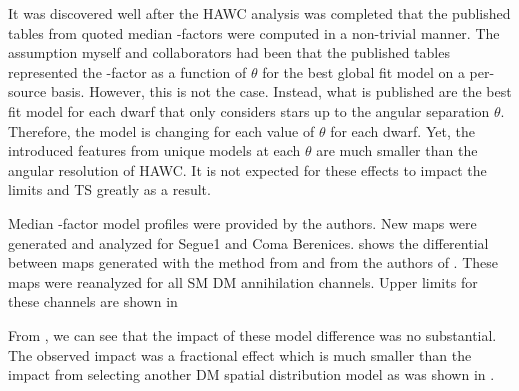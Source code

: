 It was discovered well after the HAWC analysis was completed that the published tables from \GS \cite{Geringer_Sameth_2015} quoted median \J-factors were computed in a non-trivial manner.
The assumption myself and collaborators had been that the published tables represented the \J-factor as a function of $\theta$ for the best global fit model on a per-source basis.
However, this is not the case.
Instead, what is published are the best fit model for each dwarf that only considers stars up to the angular separation $\theta$.
Therefore, the model is changing for each value of $\theta$ for each dwarf.
Yet, the introduced features from unique models at each $\theta$ are much smaller than the angular resolution of HAWC.
It is not expected for these effects to impact the limits and TS greatly as a result.

Median \J-factor model profiles were provided by the authors.
New maps were generated and analyzed for Segue1 and Coma Berenices.
 shows the differential between maps generated with the method from  and from the authors of \cite{Geringer_Sameth_2015}.
These maps were reanalyzed for all SM DM annihilation channels.
Upper limits for these channels are shown in 

From , we can see that the impact of these model difference was no substantial.
The observed impact was a fractional effect which is much smaller than the impact from selecting another DM spatial distribution model as was shown in .

